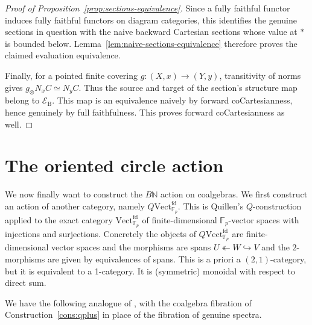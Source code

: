 \documentclass[11pt,a4paper]{article}
\theoremstyle{definition}
\newcommand{\Fp}{\mathbb F_p}
\newcommand{\Vect}{\mathrm{Vect}^{\mathrm{fd}}_{\Fp}}
\begin{document}
\begin{proof}[Proof of Proposition~\ref{prop:sections-equivalence}]
Since a fully faithful functor induces fully faithful functors
on diagram categories, this identifies the genuine sections in
question with the naive backward Cartesian sections whose value
at $*$ is bounded below. Lemma~\ref{lem:naive-sections-equivalence}
therefore proves the claimed evaluation equivalence.

Finally, for a pointed finite covering $g:(X,x)\to(Y,y)$,
transitivity of norms gives $g_\otimes N_xC\simeq N_yC$.
Thus the source and target of the section's structure map belong to
$\mathcal E_{\mathrm B}$. This map is an equivalence naively by
forward coCartesianness, hence genuinely by full faithfulness.
This proves  forward coCartesianness as well.
\end{proof}

\section{The oriented circle action}\label{sec:frobenius-action}

We now finally want to construct the $B\mathbb{N}$ action on coalgebras. We first construct an action of another category, namely $Q\Vect$. This is  Quillen's $Q$-construction applied to the exact category $\Vect$ of finite-dimensional $\Fp$-vector spaces with injections and surjections. Concretely the objects of $Q\Vect$ are finite-dimensional vector spaces and  
the morphisms  are spans
$U\twoheadleftarrow W\hookrightarrow V$ and the $2$-morphisms are given by equivalences of spans. This is a priori a $(2,1)$-category, but it is equivalent to a 1-category. It is (symmetric) monoidal with respect to direct sum. 

We have the following analogue of \cite[Theorem~3.23]{Yuan}, with the coalgebra
fibration of Construction~\ref{cons:qplus} in place of the fibration
of genuine spectra.
\end{document}
